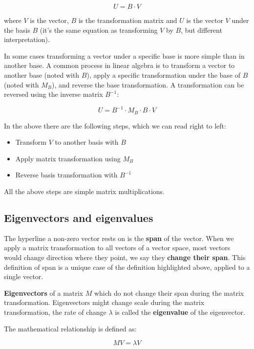 \[U = B \cdot V\]

where \(V\) is the vector, \(B\) is the transformation matrix and \(U\) is the vector \(V\) under the basis \(B\) (it's the same equation as transforming \(V\) by \(B\), but different interpretation).

In some cases transforming a vector under a specific base is more simple than in another base. A common process in linear algebra is to transform a vector to another base (noted with \(B\)), apply a specific transformation under the base of \(B\) (noted with \(M_B\)), and reverse the base transformation. A transformation can be reversed using the inverse matrix \(B^{-1}\):

\[U = B^{-1} \cdot M_B \cdot B \cdot V\]

In the above there are the following steps, which we can read right to left:
\begin{itemize}
    \item Transform \(V\) to another basis with \(B\)
    \item Apply matrix transformation using \(M_B\)
    \item Reverse basis transformation with \(B^{-1}\)
\end{itemize}

All the above steps are simple matrix multiplications.

\subsection{Eigenvectors and eigenvalues}

The hyperline a non-zero vector rests on is the \textbf{span} of the vector. When we apply a matrix transformation to all vectors of a vector space, most vectors would change direction where they point, we say they \textbf{change their span}. This definition of span is a unique case of the definition highlighted above, applied to a single vector.

\textbf{Eigenvectors} of a matrix \(M\) which do not change their span during the matrix transformation. Eigenvectors might change scale during the matrix transformation, the rate of change \(\lambda\) is called the \textbf{eigenvalue} of the eigenvector.

The mathematical relationship is defined as:

\begin{equation}MV = \lambda V \tag{II.4}\end{equation}

